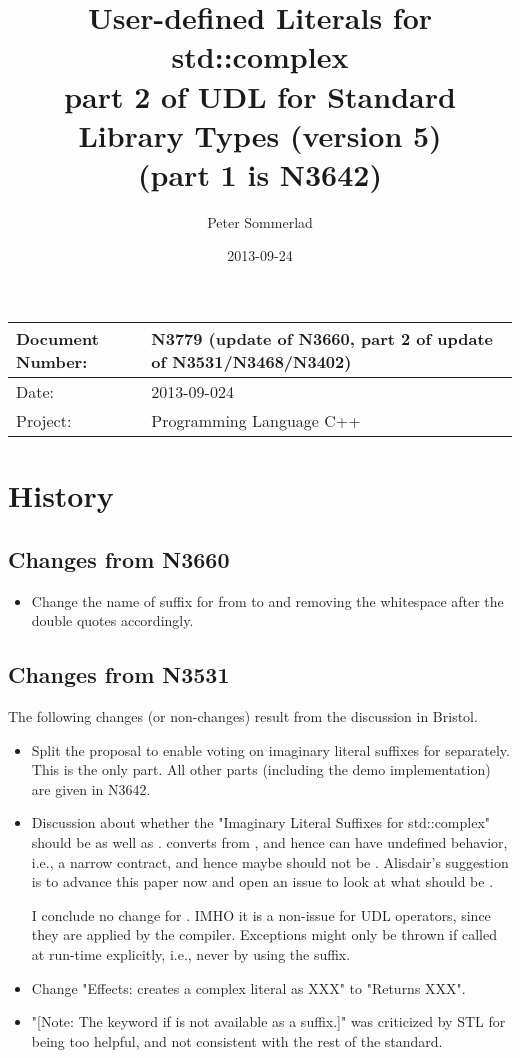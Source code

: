 \documentclass[ebook,11pt,article]{memoir}
\title{User-defined Literals for std::complex\\
{ part 2 of UDL for Standard Library Types (version 5)\\(part 1 is N3642) }
}
\author{Peter Sommerlad}
\date{2013-09-24}                                           %
\begin{document}
\maketitle
\begin{tabular}[t]{|l|l|}\hline 
Document Number: &  N3779 (update of N3660, part 2 of update of N3531/N3468/N3402)\\\hline
Date: & 2013-09-024 \\\hline
Project: & Programming Language C++\\\hline 
\end{tabular}
\chapter{History}
\section{Changes from N3660}
\begin{itemize}
\item Change the name of suffix for  from  to  and removing the whitespace after the double quotes accordingly.
\end{itemize}
\section{Changes from N3531}
The following changes (or non-changes) result from the discussion in Bristol.
\begin{itemize}
\item Split the proposal to enable voting on imaginary literal suffixes for  separately. This is the  only part. All other parts (including the demo implementation) are given in N3642.
\item Discussion about whether the "Imaginary Literal Suffixes for std::complex" should be  as well as .    converts from , and hence can have undefined behavior, i.e., a narrow contract, and hence maybe should not be .  Alisdair’s suggestion is to advance this paper now and open an issue to look at what should be . 

I conclude no change for . IMHO it is a non-issue for  UDL operators, since they are applied by the compiler. Exceptions might only be thrown if called at run-time explicitly, i.e.,  never by using the suffix.
\item  Change "Effects: creates a complex literal as XXX" to "Returns XXX". %
\item "[Note: The keyword if is not available as a suffix.]" was criticized by STL for being too helpful, and not consistent with the rest of the standard. %
\end{itemize}
\end{document}
